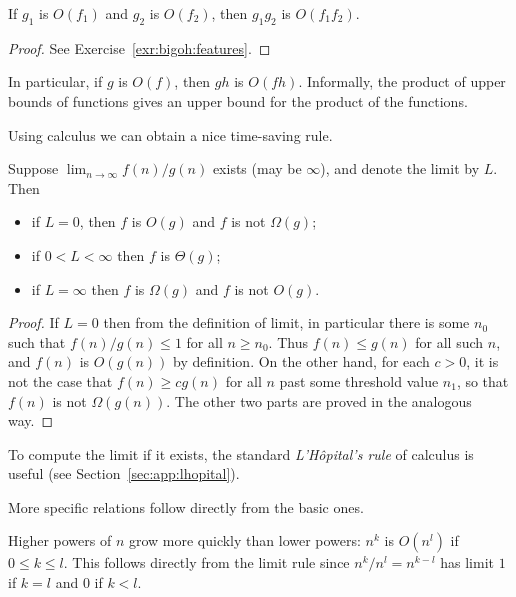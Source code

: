 
\begin{Lemma}\label{l:bigoh:4}
 If $g_{1}$ is $O(f_{1})$ and 
$g_{2}$ is $O(f_{2})$, then 
$g_{1}  g_{2}$ is $O(f_{1}  f_{2})$. 
\end{Lemma}
\begin{proof}
See Exercise~\ref{exr:bigoh:features}.
\end{proof}

In particular, if $g$ is $O(f)$, then $g  h$ is $O(f  h)$. Informally,
the product of upper bounds of functions gives an upper bound for the
product of the functions.

Using calculus we can obtain a nice time-saving rule.

\begin{Lemma} \label{l:bigoh:lim}
Suppose $\lim_{n\to \infty} f(n)/g(n)$ exists (may be $\infty$), and denote 
the limit by $L$. Then
\begin{itemize}
\item if $L=0$, then $f$ is $O(g)$ and $f$ is not $\Omega(g)$;
\item if $0 < L < \infty$ then $f$ is $\Theta(g)$;
\item if $L = \infty$ then $f$ is $\Omega(g)$ and $f$ is not $O(g)$.
\end{itemize}
\end{Lemma}

\begin{proof}
If $L = 0$ then from the definition of limit, in particular there is some 
$n_0$ such that $f(n)/g(n) \leq 1$ for all $n \geq n_0$. Thus $f(n) \leq g(n)$ 
for all such $n$, and $f(n)$ is $O(g(n))$ by definition. On the other 
hand, for each $c > 0$, it is not the case that $f(n) \geq c g(n)$ for all
$n$ past some threshold value $n_1$, so that $f(n)$ is not $\Omega(g(n))$.
The other two parts are proved in the analogous way.
\end{proof}

To compute the limit if it exists, the standard \emph{L'H\^{o}pital's rule}
of calculus is useful (see Section~\ref{sec:app:lhopital}).

More specific relations follow directly from the basic ones.

\begin{Example} 
\label{ex:powers}
Higher powers of $n$ grow more quickly than lower powers:
$n^{k}$ is $O(n^{l})$ if $0 \le k \le l$. This follows directly from the limit rule
since $n^k/n^l = n^{k-l}$ has limit $1$ if $k=l$ and $0$ if $k<l$.
\end{Example}

